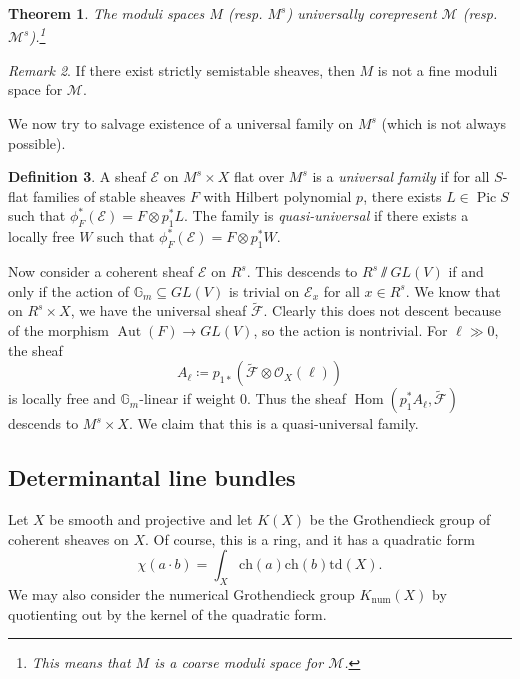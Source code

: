 \documentclass[leqno, openany]{memoir}
\newtheorem{thm}{Theorem}[section]
\theoremstyle{definition}
\newtheorem{defn}[thm]{Definition}
\theoremstyle{remark}
\newtheorem{rmk}[thm]{Remark}
\theoremstyle{plain}
\theoremstyle{definition}
\theoremstyle{remark}
\newcommand{\mc}[1]{\mathcal{#1}}
\newcommand{\mr}[1]{\mathrm{#1}}
\newcommand{\wt}[1]{\widetilde{#1}}
\DeclareMathOperator{\Hom}{Hom}
\DeclareMathOperator{\Aut}{Aut}
\DeclareMathOperator{\Pic}{Pic}
\begin{document}
\begin{thm}
    The moduli spaces $M$ (resp. $M^s$) universally corepresent $\mc{M}$ (resp. $\mc{M}^s$).\footnote{This means that $M$ is a coarse moduli space for $\mc{M}$.}
\end{thm}

\begin{rmk}
    If there exist strictly semistable sheaves, then $M$ is not a fine moduli space for $\mc{M}$.
\end{rmk}

We now try to salvage existence of a universal family on $M^s$ (which is not always possible).
\begin{defn}
    A sheaf $\mc{E}$ on $M^s \times X$ flat over $M^s$ is a \textit{universal family} if for all $S$-flat families of stable sheaves $F$ with Hilbert polynomial $p$, there exists $L \in \Pic S$ such that $\phi_F^*(\mc{E}) = F \otimes p_1^* L$. The family is \textit{quasi-universal} if there exists a locally free $W$ such that $\phi_F^*(\mc{E}) = F \otimes p_1^* W$.
\end{defn}

Now consider a coherent sheaf $\mc{E}$ on $R^s$. This descends to $R^s \sslash GL(V)$ if and only if the action of $\mathbb{G}_m \subseteq GL(V)$ is trivial on $\mc{E}_x$ for all $x \in R^s$. We know that on $R^s \times X$, we have the universal sheaf $\wt{\mc{F}}$. Clearly this does not descent because of the morphism $\Aut(F) \to GL(V)$, so the action is nontrivial. For $\ell \gg 0$, the sheaf
\[ A_{\ell} \coloneqq p_{1*}(\wt{\mc{F}} \otimes \mc{O}_X(\ell)) \]
is locally free and $\mathbb{G}_m$-linear if weight $0$. Thus the sheaf $\Hom(p_1^* A_{\ell}, \wt{\mc{F}})$ descends to $M^s \times X$. We claim that this is a quasi-universal family.

\subsection{Determinantal line bundles}%
\label{sub:determinantal_line_bundles}

Let $X$ be smooth and projective and let $K(X)$ be the Grothendieck group of coherent sheaves on $X$. Of course, this is a ring, and it has a quadratic form
\[ \chi(a \cdot b) = \int_X \mr{ch}(a) \mr{ch}(b) \mr{td}(X). \]
We may also consider the numerical Grothendieck group $K_{\mr{num}}(X)$ by quotienting out by the kernel of the quadratic form.
\end{document}
